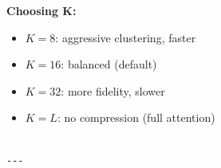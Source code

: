 \textbf{Choosing K:}

\begin{itemize}
\item $K = 8$: aggressive clustering, faster
\item $K = 16$: balanced (default)
\item $K = 32$: more fidelity, slower
\item $K = L$: no compression (full attention)
\end{itemize}
\begin{lstlisting}

---
\end{lstlisting}